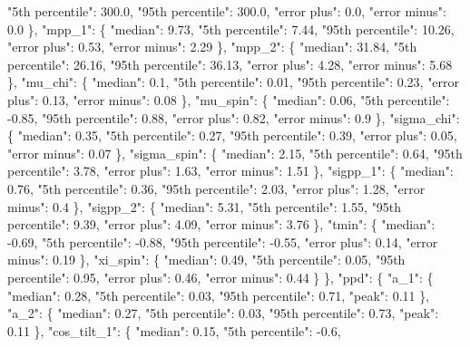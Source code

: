 {{          "5th percentile": 300.0, %
          "95th percentile": 300.0, %
          "error plus": 0.0, %
          "error minus": 0.0%
        \}, %
        "mpp\_1": \{%
          "median": 9.73, %
          "5th percentile": 7.44, %
          "95th percentile": 10.26, %
          "error plus": 0.53, %
          "error minus": 2.29%
        \}, %
        "mpp\_2": \{%
          "median": 31.84, %
          "5th percentile": 26.16, %
          "95th percentile": 36.13, %
          "error plus": 4.28, %
          "error minus": 5.68%
        \}, %
        "mu\_chi": \{%
          "median": 0.1, %
          "5th percentile": 0.01, %
          "95th percentile": 0.23, %
          "error plus": 0.13, %
          "error minus": 0.08%
        \}, %
        "mu\_spin": \{%
          "median": 0.06, %
          "5th percentile": {-}0.85, %
          "95th percentile": 0.88, %
          "error plus": 0.82, %
          "error minus": 0.9%
        \}, %
        "sigma\_chi": \{%
          "median": 0.35, %
          "5th percentile": 0.27, %
          "95th percentile": 0.39, %
          "error plus": 0.05, %
          "error minus": 0.07%
        \}, %
        "sigma\_spin": \{%
          "median": 2.15, %
          "5th percentile": 0.64, %
          "95th percentile": 3.78, %
          "error plus": 1.63, %
          "error minus": 1.51%
        \}, %
        "sigpp\_1": \{%
          "median": 0.76, %
          "5th percentile": 0.36, %
          "95th percentile": 2.03, %
          "error plus": 1.28, %
          "error minus": 0.4%
        \}, %
        "sigpp\_2": \{%
          "median": 5.31, %
          "5th percentile": 1.55, %
          "95th percentile": 9.39, %
          "error plus": 4.09, %
          "error minus": 3.76%
        \}, %
        "tmin": \{%
          "median": {-}0.69, %
          "5th percentile": {-}0.88, %
          "95th percentile": {-}0.55, %
          "error plus": 0.14, %
          "error minus": 0.19%
        \}, %
        "xi\_spin": \{%
          "median": 0.49, %
          "5th percentile": 0.05, %
          "95th percentile": 0.95, %
          "error plus": 0.46, %
          "error minus": 0.44%
        \}%
      \}, %
      "ppd": \{%
        "a\_1": \{%
          "median": 0.28, %
          "5th percentile": 0.03, %
          "95th percentile": 0.71, %
          "peak": 0.11%
        \}, %
        "a\_2": \{%
          "median": 0.27, %
          "5th percentile": 0.03, %
          "95th percentile": 0.73, %
          "peak": 0.11%
        \}, %
        "cos\_tilt\_1": \{%
          "median": 0.15, %
          "5th percentile": {-}0.6, %
}}
